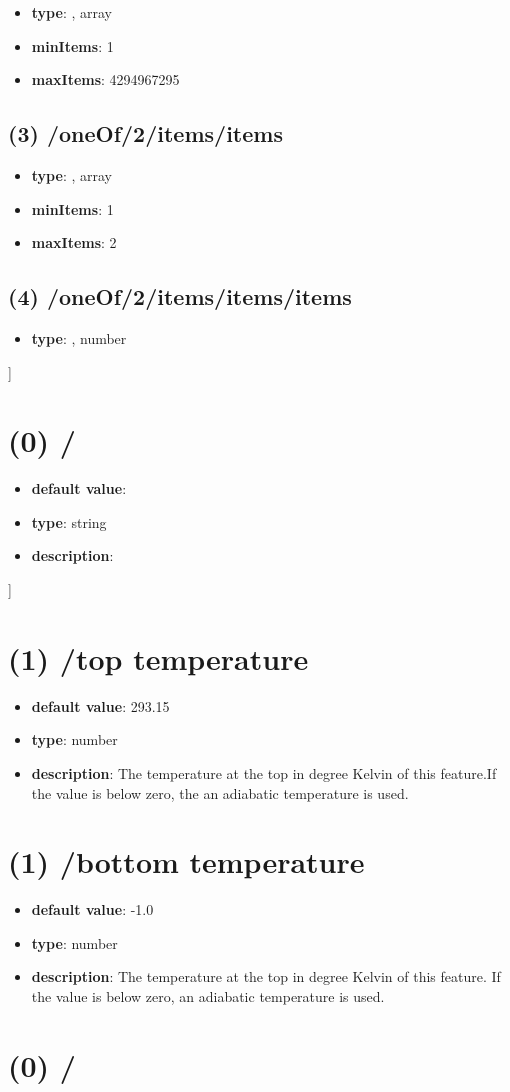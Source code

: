 \begin{itemize}[leftmargin=2em]\item {\bf type}: , array\item {\bf minItems}: 1
\item {\bf maxItems}: 4294967295
\end{itemize}\subsection{(3) /oneOf/2/items/items}
\begin{itemize}[leftmargin=3em]\item {\bf type}: , array\item {\bf minItems}: 1
\item {\bf maxItems}: 2
\end{itemize}\subsection{(4) /oneOf/2/items/items/items}
\begin{itemize}[leftmargin=4em]\item {\bf type}: , number\end{itemize}]\section{(0) /}
\begin{itemize}[leftmargin=0em]\item {\bf default value}: 
\item {\bf type}: string
\item {\bf description}: 
\end{itemize}]\section{(1) /top temperature}
\begin{itemize}[leftmargin=1em]\item {\bf default value}: 293.15
\item {\bf type}: number
\item {\bf description}: The temperature at the top in degree Kelvin of this feature.If the value is below zero, the an adiabatic temperature is used.
\end{itemize}\section{(1) /bottom temperature}
\begin{itemize}[leftmargin=1em]\item {\bf default value}: -1.0
\item {\bf type}: number
\item {\bf description}: The temperature at the top in degree Kelvin of this feature. If the value is below zero, an adiabatic temperature is used.
\end{itemize}\section{(0) /}
